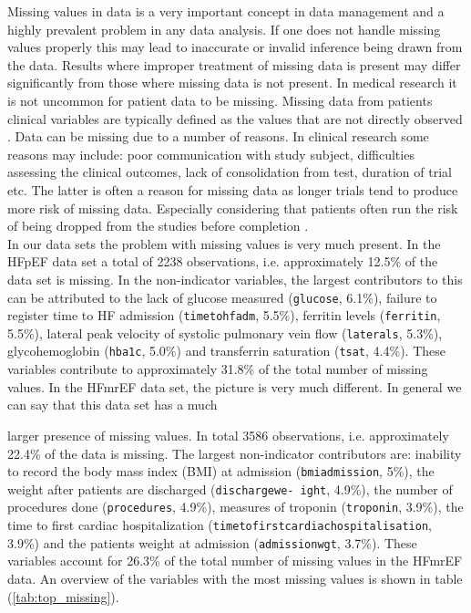 \documentclass[../thesis.tex]{subfiles}
\begin{document}
\noindent Missing values in data is a very important concept in data management and a highly prevalent problem in any data analysis. If one does not handle missing values properly this may lead to inaccurate or invalid inference being drawn from the data. Results where improper treatment of missing data is present may differ significantly from those where missing data is not present. In medical research it is not uncommon for patient data to be missing. Missing data from patients clinical variables are typically defined as the values that are not directly observed \citep{ibrahim2012missing}. Data can be missing due to a number of reasons. In clinical research some reasons may include: poor communication with study subject, difficulties assessing the clinical outcomes, lack of consolidation from test, duration of trial etc. The latter is often a reason for missing data as longer trials tend to produce more risk of missing data. Especially considering that patients often run the risk of being dropped from the studies before completion \citep{myers2000handling}.\\
\indent In our data sets the problem with missing values is very much present. In the HFpEF data set a total of 2238 observations, i.e. approximately 12.5\% of the data set is missing. In the non-indicator variables, the largest contributors to this can be attributed to the lack of glucose measured (\texttt{glucose}, 6.1\%), failure to register time to HF admission (\texttt{timetohfadm}, 5.5\%), ferritin levels (\texttt{ferritin}, 5.5\%), lateral peak velocity of systolic pulmonary vein flow (\texttt{laterals}, 5.3\%), glycohemoglobin (\texttt{hba1c}, 5.0\%) and transferrin saturation (\texttt{tsat}, 4.4\%). These variables contribute to approximately 31.8\% of the total number of missing values. In the HFmrEF data set, the picture is very much different. In general we can say that this data set has a much  



\noindent larger presence of missing values. In total 3586 observations, i.e. approximately 22.4\% of the data is missing. The largest non-indicator contributors are: inability to record the body mass index (BMI) at admission (\texttt{bmiadmission}, 5\%), the weight after patients are discharged (\texttt{dischargewe- ight}, 4.9\%), the number of procedures done (\texttt{procedures}, 4.9\%), measures of troponin (\texttt{troponin}, 3.9\%), the time to first cardiac hospitalization (\texttt{timetofirstcardiachospitalisation}, 3.9\%) and the patients weight at admission (\texttt{admissionwgt}, 3.7\%). These variables account for 26.3\% of the total number of missing values in the HFmrEF data. An overview of the variables with the most missing values is shown in table (\ref{tab:top_missing}).
\end{document}
